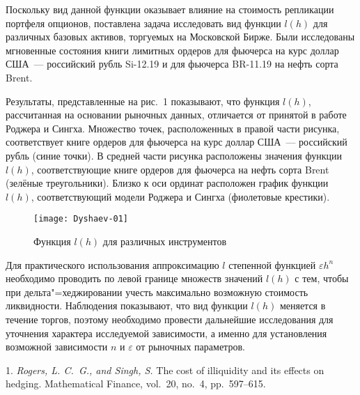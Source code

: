 Поскольку вид данной функции оказывает влияние на стоимость репликации портфеля опционов,  поставлена задача исследовать вид функции $l(h)$ для различных базовых активов, торгуемых на Московской Бирже. Были исследованы мгновенные состояния книги лимитных ордеров для фьючерса на курс доллар США~--- российский рубль Si-12.19 и для фьючерса BR-11.19 на нефть сорта Brent.

Результаты, представленные на рис.~1 показывают, что функция  $l(h)$, рассчитанная на основании рыночных данных, отличается от принятой в работе Роджера и Сингха. Множество точек, расположенных в правой части рисунка, соответствует книге ордеров для фьючерса на курс доллар США~--- российский рубль (синие точки). В средней части рисунка расположены значения функции $l(h)$, соответствующие книге ордеров для фьючерса на нефть сорта Brent (зелёные треугольники). Близко к оси ординат расположен график функции $l(h)$, соответствующий модели Роджера и Сингха (фиолетовые крестики).
\begin{figure}
	\centering
	\texttt{[image: Dyshaev-01]}
	\caption{\footnotesize Функция $l(h)$ для различных инструментов}
	\label{fig:dyshaev-01}
\end{figure}

Для практического использования аппроксимацию $l$ степенной функцией $\varepsilon h^n$ необходимо проводить по левой границе множеств значений $l(h)$ с тем, чтобы при дельта"=хед\-жи\-ро\-ва\-нии учесть максимально возможную стоимость ликвидности. Наблюдения показывают, что вид функции $l(h)$ меняется в течение торгов, поэтому необходимо провести дальнейшие исследования для уточнения характера исследуемой зависимости, а именно для установления возможной зависимости  $n$ и $\varepsilon$ от  рыночных параметров.

\litlist

1. {\it Rogers, L. C.~G., and Singh, S.} The cost of illiquidity and its effects on hedging. Mathematical Finance, vol.~20, no.~4, pp.~597--615.
